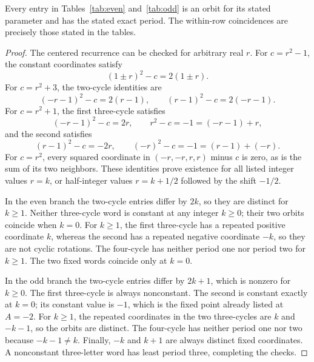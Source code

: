 \begin{lemma}
\label{lem:existence}
Every entry in Tables~\ref{tab:even} and~\ref{tab:odd} is an orbit for
its stated parameter and has the stated exact period. The within-row
coincidences are precisely those stated in the tables.
\end{lemma}
\begin{proof}
The centered recurrence can be checked for arbitrary real \(r\).
For \(c=r^2-1\), the constant coordinates satisfy
\[
 (1\pm r)^2-c=2(1\pm r).
\]
For \(c=r^2+3\), the two-cycle identities are
\[
 (-r-1)^2-c=2(r-1),\qquad (r-1)^2-c=2(-r-1).
\]
For \(c=r^2+1\), the first three-cycle satisfies
\[
 (-r-1)^2-c=2r,\qquad r^2-c=-1=(-r-1)+r,
\]
and the second satisfies
\[
 (r-1)^2-c=-2r,\qquad (-r)^2-c=-1=(r-1)+(-r).
\]
For \(c=r^2\), every squared coordinate in \((-r,-r,r,r)\) minus
\(c\) is zero, as is the sum of its two neighbors. These identities
prove existence for all listed integer values \(r=k\), or
half-integer values \(r=k+1/2\) followed by the shift \(-1/2\).

In the even branch the two-cycle entries differ by \(2k\), so they
are distinct for \(k\ge1\). Neither three-cycle word is constant at
any integer \(k\ge0\); their two orbits coincide when \(k=0\).
For \(k\ge1\), the first three-cycle has a repeated positive
coordinate \(k\), whereas the second has a repeated negative
coordinate \(-k\), so they are not cyclic rotations. The four-cycle
has neither period one nor period two for \(k\ge1\). The two fixed
words coincide only at \(k=0\).

In the odd branch the two-cycle entries differ by \(2k+1\), which is
nonzero for \(k\ge0\). The first three-cycle is always nonconstant.
The second is constant exactly at \(k=0\); its constant value is
\(-1\), which is the fixed point already listed at \(A=-2\).
For \(k\ge1\), the repeated coordinates in the two three-cycles are
\(k\) and \(-k-1\), so the orbits are distinct. The four-cycle has
neither period one nor two because \(-k-1\ne k\). Finally, \(-k\)
and \(k+1\) are always distinct fixed coordinates. A nonconstant
three-letter word has least period three, completing the checks.
\end{proof}
